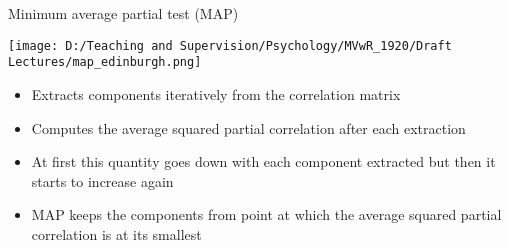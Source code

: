 \documentclass[
  ignorenonframetext,
]{beamer}
\providecommand{\tightlist}{%
  \setlength{\itemsep}{0pt}\setlength{\parskip}{0pt}}
\begin{document}
\begin{frame}{Minimum average partial test (MAP)}
\protect\hypertarget{minimum-average-partial-test-map}{}

\texttt{[image: D:/Teaching and Supervision/Psychology/MVwR\_1920/Draft Lectures/map\_edinburgh.png]}

\begin{itemize}
\tightlist
\item
  Extracts components iteratively from the correlation matrix
\item
  Computes the average squared partial correlation after each extraction
\item
  At first this quantity goes down with each component extracted but
  then it starts to increase again
\item
  MAP keeps the components from point at which the average squared
  partial correlation is at its smallest
\end{itemize}

\end{frame}
\end{document}
